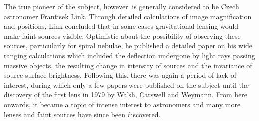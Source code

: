         The true pioneer of the subject, however, is generally considered to be Czech astronomer\cite{F_Link_GL} Frantisek Link. Through detailed calculations of image magnification and positions, Link concluded that in some cases gravitational lensing would make faint sources visible. Optimistic about the possibility of observing these sources, particularly for spiral nebulae, he published a detailed paper on his wide ranging calculations which included the deflection undergone by light rays passing massive objects, the resulting change in intensity of sources and the invariance of source surface brightness. Following this, there was again a period of lack of interest, during which only a few papers were published on the subject until the discovery of the first lens in 1979 by Walsh, Carswell and Weymann. From here onwards, it became a topic of intense interest to astronomers and many more lenses and faint sources have since been discovered\cite{Conceptual_origins_of_GL}.

